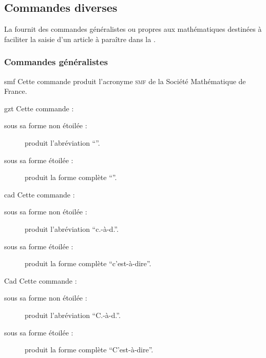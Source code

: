 \subsection{Commandes diverses}
\label{sec-commandes-diverses}

La \gztauthorcl{} fournit des commandes généralistes ou propres aux
mathématiques destinées à faciliter la saisie d'un article à paraître dans la
\gzt{}.

\subsubsection{Commandes généralistes}
\label{sec-comm-gener}

\begin{docCommand}{smf}{}
  Cette commande produit l'acronyme \textsc{smf} de la Société Mathématique de
  France.
\end{docCommand}

\begin{docCommand}{gzt}{}
  Cette commande :
  \begin{description}
  \item[sous sa forme non étoilée :] produit l'abréviation \enquote{\gzt}.
  \item[sous sa forme étoilée :] produit la forme complète \enquote{\gzt*}.
  \end{description}
\end{docCommand}

\begin{docCommand}{cad}{}
  Cette commande :
  \begin{description}
  \item[sous sa forme non étoilée :] produit l'abréviation \enquote{c.-à-d.}.
  \item[sous sa forme étoilée :] produit la forme complète
    \enquote{c'est-à-dire}.
  \end{description}
\end{docCommand}

\begin{docCommand}{Cad}{}
  Cette commande :
  \begin{description}
  \item[sous sa forme non étoilée :] produit l'abréviation \enquote{C.-à-d.}.
  \item[sous sa forme étoilée :] produit la forme complète
    \enquote{C'est-à-dire}.
  \end{description}
\end{docCommand}

